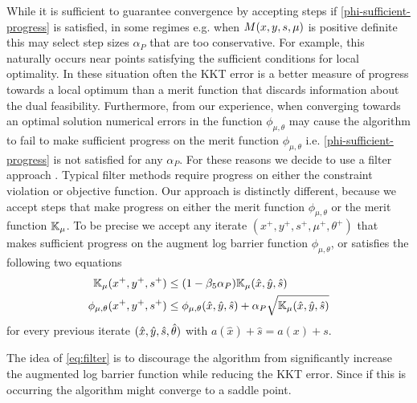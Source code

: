 \documentclass{article}
\begin{document}
While it is sufficient to guarantee convergence by accepting steps if \eqref{phi-sufficient-progress} is satisfied, in some regimes e.g. when $M(x, y, s, \mu)$ is positive definite this may select step sizes $\alpha_{P}$ that are too conservative.  For example, this naturally occurs near points satisfying the sufficient conditions for local optimality. In these situation often the KKT error is a better measure of progress towards a local optimum than a merit function that discards information about the dual feasibility. Furthermore, from our experience, when converging towards an optimal solution numerical errors in the function $\phi_{\mu,\theta}$ may cause the algorithm to fail to make sufficient progress on the merit function $\phi_{\mu,\theta}$ i.e. \eqref{phi-sufficient-progress} is not satisfied for any $\alpha_{P}$. For these reasons we decide to use a filter approach \cite{fletcher2002nonlinear,wachter2006implementation}. Typical filter methods \cite{fletcher2002nonlinear} require progress on either the constraint violation or objective function. Our approach is distinctly different, because we accept steps that make progress on either the merit function $\phi_{\mu,\theta}$ or the merit function $\mathbb{K}_{\mu}$.
To be precise we accept any iterate $(x^{+}, y^{+}, s^{+}, \mu^{+}, \theta^{+})$ that makes sufficient progress on the augment log barrier function $\phi_{\mu,\theta}$, or satisfies the following two equations
\begin{subequations}\label{eq:filter}
\begin{flalign}
\meritKKT_{\mu} (x^{+}, y^{+}, s^{+}) &\le (1 - \parKKTReductFactor \alpha_{P} ) \meritKKT_{\mu} (\hat{x}, \hat{y}, \hat{s}) \\
\phi_{\mu,\theta}(x^{+}, y^{+}, s^{+}) &\le \phi_{\mu,\theta}(\hat{x}, \hat{y}, \hat{s}) + \alpha_{P} \sqrt{\meritKKT_{\mu} (\hat{x}, \hat{y}, \hat{s})} %
\end{flalign} %
\end{subequations}
 for every previous iterate $(\hat{x}, \hat{y}, \hat{s}, \hat{\theta})$ with $a(\hat{x}) + \hat{s} = a(x) + s$.

The idea of \eqref{eq:filter} is to discourage the algorithm from significantly increase the augmented log barrier function while reducing the KKT error. Since if this is occurring the algorithm might converge to a saddle point. 
\end{document}
